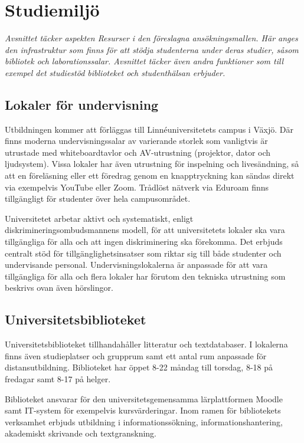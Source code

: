 \chapter{Studiemiljö\label{ch:resurser}}

\begin{tcbdoublebox}
\emph{Avsnittet täcker aspekten Resurser i den föreslagna ansökningsmallen. Här anges den infrastruktur som finns för att stödja studenterna under deras studier, såsom bibliotek och laborationssalar. Avsnittet täcker även andra funktioner som till exempel det studiestöd biblioteket och studenthälsan erbjuder.}
\end{tcbdoublebox}

\section{Lokaler för undervisning}

Utbildningen kommer att förläggas till Linnéuniversitetets campus i Växjö. Där finns moderna undervisningssalar av varierande storlek som vanligtvis är utrustade med whiteboardtavlor och AV-utrustning (projektor, dator och ljudsystem). Vissa lokaler har även utrustning för inspelning och livesändning, så att en föreläsning eller ett föredrag genom en knapptryckning kan sändas direkt via exempelvis YouTube eller Zoom. Trådlöst nätverk via Eduroam finns tillgängligt för studenter över hela campusområdet.

Universitetet arbetar aktivt och systematiskt, enligt diskrimineringsombudsmannens modell, för att universitetets lokaler ska vara tillgängliga för alla och att ingen diskriminering ska förekomma. Det erbjuds centralt stöd för tillgänglighetsinsatser som riktar sig till både studenter och undervisande personal. Undervisningslokalerna är anpassade för att vara tillgängliga för alla och flera lokaler har förutom den tekniska utrustning som beskrivs ovan även hörslingor.

\section{Universitetsbiblioteket}

Universitetsbiblioteket tillhandahåller litteratur och textdatabaser. I lokalerna finns även studieplatser och grupprum samt ett antal rum anpassade för distansutbildning. Biblioteket har öppet 8-22 måndag till torsdag, 8-18 på fredagar samt 8-17 på helger.

Biblioteket ansvarar för den universitetsgemensamma lärplattformen Moodle samt IT-system för exempelvis kursvärderingar. Inom ramen för bibliotekets verksamhet erbjuds utbildning i informationssökning, informationshantering, akademiskt skrivande och textgranskning.
 
